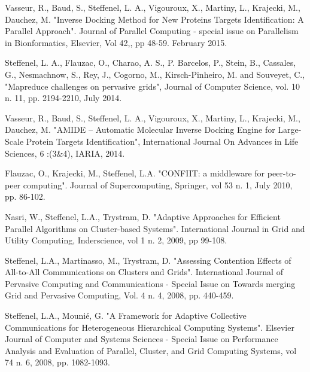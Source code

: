 \documentclass[final,twoside]{hdr} %
\begin{document}
Vasseur, R., Baud, S., Steffenel, L. A., Vigouroux, X., Martiny, L., Krajecki, M., Dauchez, M. "Inverse Docking Method for New Proteins Targets Identification: A Parallel Approach". Journal of Parallel Computing - special issue on Parallelism in Bionformatics, Elsevier, Vol 42,, pp 48-59. February 2015. 

Steffenel, L. A., Flauzac, O., Charao, A. S., P. Barcelos, P., Stein, B., Cassales, G., Nesmachnow, S., Rey, J., Cogorno, M., Kirsch-Pinheiro, M. and Souveyet, C., "Mapreduce challenges on pervasive grids", Journal of Computer Science, vol. 10 n. 11, pp. 2194-2210, July 2014. 

Vasseur, R., Baud, S., Steffenel, L. A., Vigouroux, X., Martiny, L., Krajecki, M., Dauchez, M.  "AMIDE – Automatic Molecular Inverse Docking Engine for Large-Scale Protein Targets Identification", International Journal On Advances in Life Sciences, 6 :(3\&4), IARIA, 2014.

Flauzac, O., Krajecki, M., Steffenel, L.A. "CONFIIT: a middleware for peer-to-peer computing". Journal of Supercomputing, Springer, vol 53 n. 1, July 2010, pp. 86-102. 

Nasri, W., Steffenel, L.A., Trystram, D. "Adaptive Approaches for Efficient Parallel Algorithms on Cluster-based Systems". International Journal in Grid and Utility Computing, Inderscience, vol 1 n. 2, 2009, pp 99-108. 

Steffenel, L.A., Martinasso, M., Trystram, D. "Assessing Contention Effects of All-to-All Communications on Clusters and Grids". International Journal of Pervasive Computing and Communications - Special Issue on Towards merging Grid and Pervasive Computing, Vol. 4 n. 4, 2008, pp. 440-459. 

Steffenel, L.A., Mounié, G. "A Framework for Adaptive Collective Communications for Heterogeneous Hierarchical Computing Systems". Elsevier Journal of Computer and Systems Sciences - Special Issue on Performance Analysis and Evaluation of Parallel, Cluster, and Grid Computing Systems, vol 74 n. 6, 2008, pp. 1082-1093.

%
%
\end{document}
